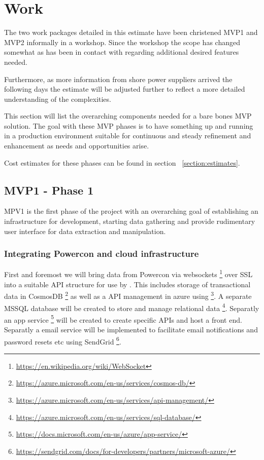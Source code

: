 \section{Work}
The two work packages detailed in this estimate have been christened MVP1 and MVP2 informally in a workshop. Since the workshop the scope has changed somewhat as \suppliername has been in contact with \customername regarding additional desired features needed. 

Furthermore, as more information from shore power suppliers arrived the following days the estimate will be adjusted further to reflect a more detailed understanding of the complexities.

This section will list the overarching components needed for a bare bones MVP solution. The goal with these MVP phases is to have something up and running in a production environment suitable for continuous and steady refinement and enhancement as needs and opportunities arise. 

Cost estimates for these phases can be found in section ~\ref{section:estimates}.


\subsection{MVP1 - Phase 1}
MPV1 is the first phase of the project with an overarching goal of establishing an infrastructure for development, starting data gathering and provide rudimentary user interface for data extraction and manipulation.

\subsubsection{Integrating Powercon and cloud infrastructure}
First and foremost we will bring data from Powercon via websockets \footnote{\url{https://en.wikipedia.org/wiki/WebSocket}} over SSL into a suitable API structure for use by \customername. This includes storage of transactional data in CosmosDB \footnote{\url{https://azure.microsoft.com/en-us/services/cosmos-db/}} as well as a API management in azure using \footnote{\url{https://azure.microsoft.com/en-us/services/api-management/}}. A separate MSSQL database will be created to store and manage relational data \footnote{\url{https://azure.microsoft.com/en-us/services/sql-database/}}. Separatly an app service \footnote{\url{https://docs.microsoft.com/en-us/azure/app-service/}} will be created to create specific APIs and host a front end. Separatly a email service will be implemented to facilitate email notifications and password resets etc using SendGrid \footnote{\url{https://sendgrid.com/docs/for-developers/partners/microsoft-azure/}}.

